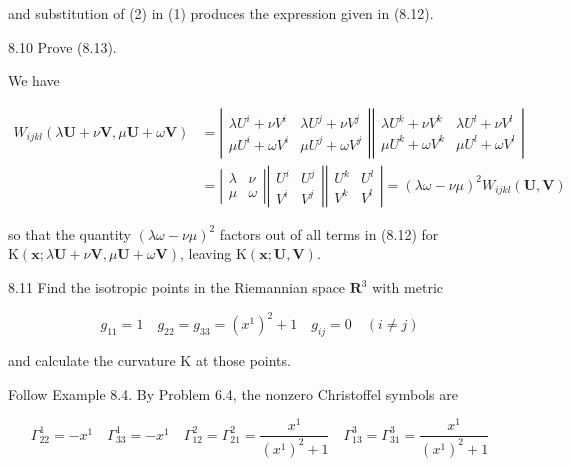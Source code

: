 \documentclass[10pt]{article}
\begin{document}
and substitution of (2) in (1) produces the expression given in (8.12).

8.10 Prove (8.13).

We have

$$
\begin{aligned}
W_{i j k l}(\lambda \mathbf{U}+\nu \mathbf{V}, \mu \mathbf{U}+\omega \mathbf{V}) & =\left|\begin{array}{cc}
\lambda U^{i}+\nu V^{i} & \lambda U^{j}+\nu V^{j} \\
\mu U^{i}+\omega V^{i} & \mu U^{j}+\omega V^{j}
\end{array}\right|\left|\begin{array}{cc}
\lambda U^{k}+\nu V^{k} & \lambda U^{l}+\nu V^{l} \\
\mu U^{k}+\omega V^{k} & \mu U^{l}+\omega V^{l}
\end{array}\right| \\
& =\left|\begin{array}{cc}
\lambda & \nu \\
\mu & \omega
\end{array}\right|\left|\begin{array}{ll}
U^{i} & U^{j} \\
V^{i} & V^{j}
\end{array}\right|\left|\begin{array}{ll}
U^{k} & U^{l} \\
V^{k} & V^{l}
\end{array}\right|=(\lambda \omega-\nu \mu)^{2} W_{i j k l}(\mathbf{U}, \mathbf{V})
\end{aligned}
$$

so that the quantity $(\lambda \omega-\nu \mu)^{2}$ factors out of all terms in (8.12) for $\mathrm{K}(\mathbf{x} ; \lambda \mathbf{U}+\nu \mathbf{V}, \mu \mathbf{U}+\omega \mathbf{V})$, leaving $\mathrm{K}(\mathbf{x} ; \mathbf{U}, \mathbf{V})$.

8.11 Find the isotropic points in the Riemannian space $\mathbf{R}^{3}$ with metric

$$
g_{11}=1 \quad g_{22}=g_{33}=\left(x^{1}\right)^{2}+1 \quad g_{i j}=0 \quad(i \neq j)
$$

and calculate the curvature $\mathrm{K}$ at those points.

Follow Example 8.4. By Problem 6.4, the nonzero Christoffel symbols are

$$
\Gamma_{22}^{1}=-x^{1} \quad \Gamma_{33}^{1}=-x^{1} \quad \Gamma_{12}^{2}=\Gamma_{21}^{2}=\frac{x^{1}}{\left(x^{1}\right)^{2}+1} \quad \Gamma_{13}^{3}=\Gamma_{31}^{3}=\frac{x^{1}}{\left(x^{1}\right)^{2}+1}
$$
\end{document}
